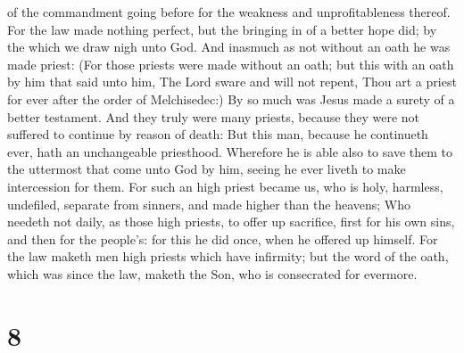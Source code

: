 of the commandment going before for the weakness and unprofitableness
thereof.  For the law made nothing perfect, but the
bringing in of a better hope did; by the which we draw nigh unto God.
 And inasmuch as not without an oath he was made priest:
 (For those priests were made without an oath; but this
with an oath by him that said unto him, The Lord sware and will not
repent, Thou art a priest for ever after the order of Melchisedec:)
 By so much was Jesus made a surety of a better testament.
 And they truly were many priests, because they were not
suffered to continue by reason of death:  But this man,
because he continueth ever, hath an unchangeable priesthood.
 Wherefore he is able also to save them to the uttermost
that come unto God by him, seeing he ever liveth to make intercession
for them.  For such an high priest became us, who is holy,
harmless, undefiled, separate from sinners, and made higher than the
heavens;  Who needeth not daily, as those high priests, to
offer up sacrifice, first for his own sins, and then for the people's:
for this he did once, when he offered up himself.  For the
law maketh men high priests which have infirmity; but the word of the
oath, which was since the law, maketh the Son, who is consecrated for
evermore.

\hypertarget{section-7}{%
\section{8}\label{section-7}}

